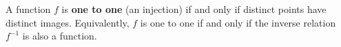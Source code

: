 A function $f$ is \textbf{one to one} (an injection) if and only if distinct points have distinct images. Equivalently, $f$ is one to one if and only if the inverse relation $f^{-1}$ is also a function.
